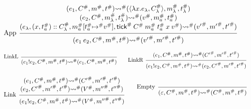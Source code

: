 \documentclass[acmsmall,review]{acmart}\settopmatter{printfolios=true,printccs=false,printacmref=false}
\theoremstyle{definition}
\newcommand*{\cons}{::}
\newcommand*{\A}[1]{{#1}^{\#}}
\newcommand*{\mem}{m}
\newcommand*{\link}[2]{{#1}\mathtt{!}{#2}}
\newcommand*{\tick}{\mathsf{tick}}
\begin{document}
\begin{figure}[h!]
  \[
    \begin{prooftree}
      \hypo{
        \begin{matrix}
          (e_{1}, \A{C}, \A\mem, \A{t})
          \A\rightsquigarrow
          (\langle\lambda x.e_{\lambda}, \A{C}_{\lambda}\rangle, \A\mem_{\lambda}, \A{t}_{\lambda}) \\
          (e_{2}, \A{C}, \A\mem_{\lambda}, \A{t}_{\lambda})
          \A\rightsquigarrow
          (\A{v}, \A\mem_{a}, \A{t}_{a})                                                            \\
          (e_{\lambda}, (x, \A{t}_{a})\cons \A{C}_{\lambda}, \A\mem_{a}[\A{t}_{a}\A\mapsto \A{v}], \A\tick\:\A{C}\:\A\mem_{a}\:\A{t}_{a}\:x\:\A{v})
          \A\rightsquigarrow
          (\A{v'}, \A{\mem'},\A{t'})
        \end{matrix}
      }
      \infer[left label={App}]1{
      (e_{1}\:e_{2}, \A{C}, \A\mem, \A{t})
      \A\rightsquigarrow
      (\A{v'}, \A{\mem'},\A{t'})
      }
    \end{prooftree}
  \]

  \[
    \begin{prooftree}
      \infer[left label=LinkL]0{
      (\link{e_{1}}{e_{2}}, \A{C}, \A\mem, \A{t})
      \A\rightsquigarrow
      (e_{1}, \A{C}, \A\mem, \A{t})
      }
    \end{prooftree}\qquad
    \begin{prooftree}
      \hypo{
        \begin{matrix}
          (e_{1}, \A{C}, \A\mem, \A{t})
          \A\rightsquigarrow
          (\A{C'}, \A{\mem'}, \A{t'})
        \end{matrix}
      }
      \infer[left label=LinkR]1{
      (\link{e_{1}}{e_{2}}, \A{C}, \A\mem, \A{t})
      \A\rightsquigarrow
      (e_{2}, \A{C'}, \A{\mem'}, \A{t'})
      }
    \end{prooftree}
  \]

  \[
    \begin{prooftree}
      \hypo{
        \begin{matrix}
          (e_{1}, \A{C}, \A\mem, \A{t})
          \A\rightsquigarrow
          (\A{C'}, \A{\mem'}, \A{t'}) \\
          (e_{2}, \A{C'}, \A{\mem'}, \A{t'})
          \A\rightsquigarrow
          (\A{V}, \A{\mem''}, \A{t''})
        \end{matrix}
      }
      \infer[left label=Link]1{
      (\link{e_{1}}{e_{2}}, \A{C}, \A\mem, \A{t})
      \A\rightsquigarrow
      (\A{V}, \A{\mem''}, \A{t''})
      }
    \end{prooftree}\qquad
    \begin{prooftree}
      \infer[left label=Empty]0{
      (\varepsilon, \A{C}, \A\mem, \A{t})
      \A\rightsquigarrow
      (\A{C}, \A\mem, \A{t})
      }
    \end{prooftree}
  \]


\end{figure}
\end{document}
